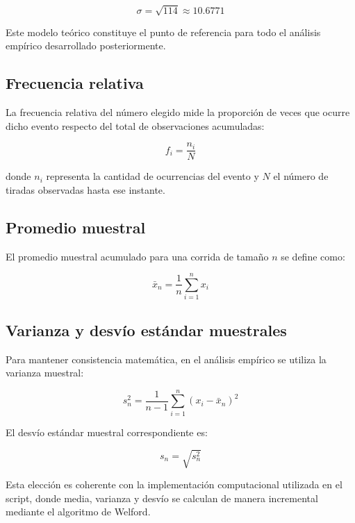 \documentclass{article}
\begin{document}
\begin{equation}
\sigma = \sqrt{114} \approx 10.6771
\end{equation}

Este modelo teórico constituye el punto de referencia para todo el análisis empírico desarrollado posteriormente.

\subsection{Frecuencia relativa}
La frecuencia relativa del número elegido mide la proporción de veces que ocurre dicho evento respecto del total de observaciones acumuladas:

\begin{equation}
f_i = \frac{n_i}{N}
\end{equation}

donde $n_i$ representa la cantidad de ocurrencias del evento y $N$ el número de tiradas observadas hasta ese instante.

\subsection{Promedio muestral}
El promedio muestral acumulado para una corrida de tamaño $n$ se define como:

\begin{equation}
\bar{x}_n = \frac{1}{n} \sum_{i=1}^{n} x_i
\end{equation}

\subsection{Varianza y desvío estándar muestrales}
Para mantener consistencia matemática, en el análisis empírico se utiliza la varianza muestral:

\begin{equation}
s_n^2 = \frac{1}{n - 1} \sum_{i=1}^{n} (x_i - \bar{x}_n)^2
\end{equation}

El desvío estándar muestral correspondiente es:

\begin{equation}
s_n = \sqrt{s_n^2}
\end{equation}

Esta elección es coherente con la implementación computacional utilizada en el script, donde media, varianza y desvío se calculan de manera incremental mediante el algoritmo de Welford.
\end{document}
